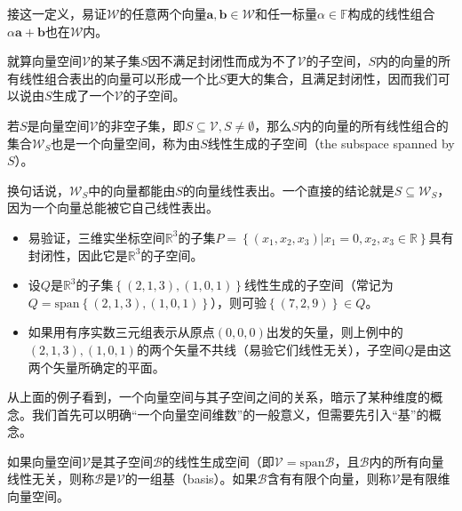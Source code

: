 \documentclass[main.tex]{subfiles}
\begin{document}
接这一定义，易证$\mathcal{W}$的任意两个向量$\mathbf{a},\mathbf{b}\in\mathcal{W}$和任一标量$\alpha\in\mathbb{F}$构成的线性组合$\alpha\mathbf{a}+\mathbf{b}$也在$\mathcal{W}$内\cite[\S 7.1定理1.1,p.169]{周胜林2012线性代数}。

就算向量空间$\mathcal{V}$的某子集$S$因不满足封闭性而成为不了$\mathcal{V}$的子空间，$S$内的向量的所有线性组合表出的向量可以形成一个比$S$更大的集合，且满足封闭性，因而我们可以说由$S$生成了一个$\mathcal{V}$的子空间。

\begin{definition}[线性生成空间]\label{def:II.2.4}
若$S$是向量空间$\mathcal{V}$的非空子集，即$S\subseteq\mathcal{V},S\neq\emptyset$，那么$S$内的向量的所有线性组合的集合$\mathcal{W}_S$也是一个向量空间，称为由$S$线性生成的子空间（the subspace spanned by $S$）。
\end{definition}

换句话说，$\mathcal{W}_S$中的向量都能由$S$的向量线性表出。一个直接的结论就是$S\subseteq\mathcal{W}_S$，因为一个向量总能被它自己线性表出。

\begin{example}\label{exp:II.2.2}
\quad
\begin{itemize}
\item 易验证，三维实坐标空间$\mathbb{R}^3$的子集$P=\left\{\left(x_1,x_2,x_3\right)|x_1=0,x_2,x_3\in\mathbb{R}\right\}$具有封闭性，因此它是$\mathbb{R}^3$的子空间。
\item 设$Q$是$\mathbb{R}^3$的子集$\left\{\left(2,1,3\right),\left(1,0,1\right)\right\}$线性生成的子空间（常记为$Q=\mathrm{span}\left\{\left(2,1,3\right),\left(1,0,1\right)\right\}$），则可验$\left\{\left(7,2,9\right)\right\}\in Q$。
\item 如果用有序实数三元组表示从原点$\left(0,0,0\right)$出发的矢量，则上例中的$\left(2,1,3\right),\left(1,0,1\right)$的两个矢量不共线（易验它们线性无关），子空间$Q$是由这两个矢量所确定的平面。
\end{itemize}
\end{example}

从上面的例子看到，一个向量空间与其子空间之间的关系，暗示了某种维度的概念。我们首先可以明确“一个向量空间维数”的一般意义，但需要先引入“基”的概念。

\begin{definition}[基]\label{def:II.2.5}
如果向量空间$\mathcal{V}$是其子空间$\mathcal{B}$的线性生成空间（即$\mathcal{V}=\mathrm{span}\mathcal{B}$，且$\mathcal{B}$内的所有向量线性无关，则称$\mathcal{B}$是$\mathcal{V}$的一组基（basis）。如果$\mathcal{B}$含有有限个向量，则称$\mathcal{V}$是有限维向量空间。
\end{definition}
\end{document}
